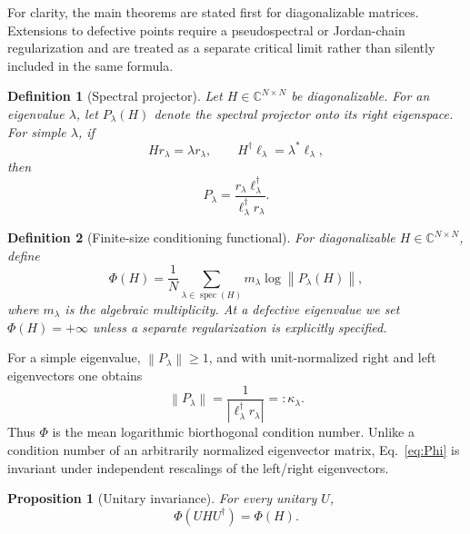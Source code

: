 \documentclass[reprint,amsmath,amssymb,aps,nofootinbib]{revtex4-2}
\newtheorem{definition}{Definition}
\newtheorem{proposition}{Proposition}
\newcommand{\norm}[1]{\left\lVert #1\right\rVert}
\newcommand{\spec}{\operatorname{spec}}
\newcommand{\PhiC}{\Phi}
\begin{document}
For clarity, the main theorems are stated first for diagonalizable matrices.
Extensions to defective points require a pseudospectral or Jordan-chain
regularization and are treated as a separate critical limit rather than
silently included in the same formula.

\begin{definition}[Spectral projector]
Let \(H\in\mathbb C^{N\times N}\) be diagonalizable. For an eigenvalue
\(\lambda\), let \(P_\lambda(H)\) denote the spectral projector onto its
right eigenspace. For simple \(\lambda\), if
\begin{equation}
Hr_\lambda=\lambda r_\lambda,
\qquad
H^\dagger \ell_\lambda=\lambda^*\ell_\lambda,
\end{equation}
then
\begin{equation}
P_\lambda
=\frac{r_\lambda\ell_\lambda^\dagger}
       {\ell_\lambda^\dagger r_\lambda}.
\end{equation}
\end{definition}

\begin{definition}[Finite-size conditioning functional]
For diagonalizable \(H\in\mathbb C^{N\times N}\), define
\begin{equation}
\boxed{
\PhiC(H)
=\frac{1}{N}\sum_{\lambda\in\spec(H)}
 m_\lambda\log\norm{P_\lambda(H)},
}
\label{eq:Phi}
\end{equation}
where \(m_\lambda\) is the algebraic multiplicity. At a defective eigenvalue we
set \(\PhiC(H)=+\infty\) unless a separate regularization is explicitly
specified.
\end{definition}

For a simple eigenvalue, \(\norm{P_\lambda}\ge1\), and with unit-normalized
right and left eigenvectors one obtains
\begin{equation}
\norm{P_\lambda}
=\frac{1}{|\ell_\lambda^\dagger r_\lambda|}
=:\kappa_\lambda.
\label{eq:kappa-simple}
\end{equation}
Thus \(\PhiC\) is the mean logarithmic biorthogonal condition number.
Unlike a condition number of an arbitrarily normalized eigenvector matrix,
Eq.~\eqref{eq:Phi} is invariant under independent rescalings of the
left/right eigenvectors.

\begin{proposition}[Unitary invariance]
\label{prop:unitary}
For every unitary \(U\),
\begin{equation}
\PhiC(UHU^\dagger)=\PhiC(H).
\end{equation}
\end{proposition}
\end{document}
